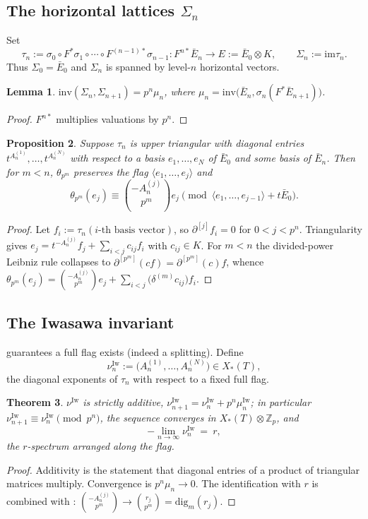 \documentclass[11pt,reqno]{amsart}
\newcommand{\Zp}{\mathbb{Z}_p}
\newcommand{\inv}{\mathrm{inv}}
\newcommand{\Iw}{\mathrm{Iw}}
\newcommand{\dig}{\mathrm{dig}}
\newcommand{\im}{\mathrm{im}}
\newcommand{\Xst}{X_*(T)}
\theoremstyle{plain}
\newtheorem{theorem}{Theorem}[section]
\newtheorem{proposition}[theorem]{Proposition}
\newtheorem{lemma}[theorem]{Lemma}
\theoremstyle{definition}
\theoremstyle{remark}
\numberwithin{equation}{section}
\begin{document}
\subsection{The horizontal lattices $\Sigma_n$}
Set
\[
   \tau_n:=\sigma_0\circ F^*\sigma_1\circ\cdots\circ F^{(n-1)*}\sigma_{n-1}
   \colon F^{n*}\bar E_n\to E:=\bar E_0\otimes K,
   \qquad \Sigma_n:=\im\tau_n .
\]
Thus $\Sigma_0=\bar E_0$ and $\Sigma_n$ is spanned by level-$n$ horizontal
vectors.

\begin{lemma}\label{lem:sigmainv}
$\inv(\Sigma_n,\Sigma_{n+1})=p^n\mu_n$, where
$\mu_n=\inv\bigl(\bar E_n,\sigma_n(F^*\bar E_{n+1})\bigr)$.
\end{lemma}
\begin{proof}
$F^{n*}$ multiplies valuations by $p^n$.
\end{proof}

\begin{proposition}\label{prop:flagres}
Suppose $\tau_n$ is upper triangular with diagonal entries
$t^{A^{(1)}_n},\dots,t^{A^{(N)}_n}$ with respect to a basis
$e_1,\dots,e_N$ of $\bar E_0$ and some basis of $\bar E_n$.  Then for
$m<n$, $\theta_{p^m}$ preserves the flag $\langle e_1,\dots,e_j\rangle$ and
\[
   \theta_{p^m}(e_j)\equiv\binom{-A^{(j)}_n}{p^m}e_j
   \pmod{\langle e_1,\dots,e_{j-1}\rangle+t\bar E_0}.
\]
\end{proposition}
\begin{proof}
Let $f_i:=\tau_n(\text{$i$-th basis vector})$, so $\partial^{[j]}f_i=0$ for
$0<j<p^n$.  Triangularity gives
$e_j=t^{-A^{(j)}_n}f_j+\sum_{i<j}c_{ij}f_i$ with $c_{ij}\in K$.  For
$m<n$ the divided-power Leibniz rule collapses to
$\partial^{[p^m]}(cf)=\partial^{[p^m]}(c)f$, whence
$\theta_{p^m}(e_j)=\binom{-A^{(j)}_n}{p^m}e_j
+\sum_{i<j}\bigl(\delta^{(m)}c_{ij}\bigr)f_i$.
\end{proof}

\subsection{The Iwasawa invariant}
 guarantees a full flag exists (indeed a
splitting).  Define
\[
   \nu_n^{\Iw}:=\bigl(A^{(1)}_n,\dots,A^{(N)}_n\bigr)\in\Xst ,
\]
the diagonal exponents of $\tau_n$ with respect to a fixed full flag.

\begin{theorem}\label{thm:comparison}
$\nu^{\Iw}$ is strictly additive,
$\nu^{\Iw}_{n+1}=\nu^{\Iw}_n+p^n\mu^{\Iw}_n$; in particular
$\nu^{\Iw}_{n+1}\equiv\nu^{\Iw}_n\pmod{p^n}$, the sequence converges in
$\Xst\otimes\Zp$, and
\[
   -\lim_{n\to\infty}\nu^{\Iw}_n\ =\ r ,
\]
the $r$-spectrum arranged along the flag.
\end{theorem}
\begin{proof}
Additivity is the statement that diagonal entries of a product of
triangular matrices multiply.  Convergence is $p^n\mu_n\to0$.  The
identification with $r$ is  combined with
: $\binom{-A^{(j)}_n}{p^m}\to\binom{r_j}{p^m}=\dig_m(r_j)$.
\end{proof}
\end{document}
